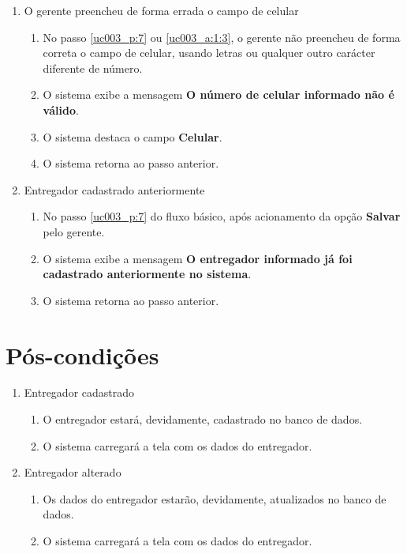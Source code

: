 \begin{enumerate}[label=E\arabic*]
	\item O gerente preencheu de forma errada o campo de celular \label{uc003_e:5}
	\begin{enumerate}[label*=.\arabic*]		
		\item[] No passo \ref{uc003_p:7} ou \ref{uc003_a:1:3}, o gerente não preencheu de forma correta o campo de celular, usando letras ou qualquer outro carácter diferente de número.		
		\item O sistema exibe a mensagem \textbf{O número de celular informado não é válido}.
		\item O sistema destaca o campo \textbf{Celular}.
		\item O sistema retorna ao passo anterior.
	\end{enumerate}	
	
	\item Entregador cadastrado anteriormente \label{uc003_e:6}
	\begin{enumerate}[label*=.\arabic*]
		\item[] No passo \ref{uc003_p:7} do fluxo básico, após acionamento da opção \textbf{Salvar} pelo gerente.
		\item O sistema exibe a mensagem \textbf{O entregador informado já foi cadastrado anteriormente no sistema}.
		\item O sistema retorna ao passo anterior.
	\end{enumerate}
\end{enumerate}

\section{Pós-condições}

\begin{enumerate}
	\item Entregador cadastrado
	\begin{enumerate}
		\item O entregador estará, devidamente, cadastrado no banco de dados.
		\item O sistema carregará a tela com os dados do entregador.
	\end{enumerate}
	
	\item Entregador alterado
	\begin{enumerate}
		\item Os dados do entregador estarão, devidamente, atualizados no banco de dados.
		\item O sistema carregará a tela com os dados do entregador.
	\end{enumerate}
\end{enumerate}

